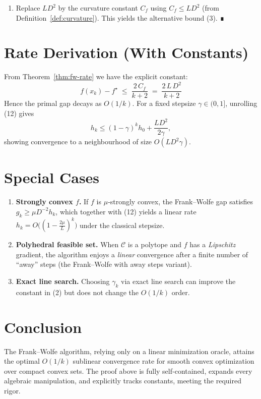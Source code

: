 \documentclass{article}
\begin{document}
\begin{enumerate}
\item[Step 9.] Replace $L D^{2}$ by the curvature constant $C_f$ using $C_f\le L D^{2}$ (from Definition~\ref{def:curvature}). This yields the alternative bound (3). ∎
\end{enumerate}

\section*{Rate Derivation (With Constants)}
From Theorem~\ref{thm:fw-rate} we have the explicit constant:
\[
\boxed{ \displaystyle
f(x_k)-f^\star \;\le\; \frac{2\,C_f}{k+2}
\;=\; \frac{2\,L\,D^{2}}{k+2}
}
\]
Hence the primal gap decays as $O(1/k)$.  For a fixed stepsize $\gamma\in(0,1]$, unrolling (12) gives
\[
h_k \le (1-\gamma)^k h_0 + \frac{L D^{2}}{2\gamma},
\]
showing convergence to a neighbourhood of size $O(L D^{2}\gamma)$.

\section*{Special Cases}
\begin{enumerate}[label=(S\arabic*)]
\item \textbf{Strongly convex $f$.} If $f$ is $\mu$‑strongly convex, the Frank–Wolfe gap satisfies $g_k \ge \mu D^{-2} h_k$, which together with (12) yields a linear rate $h_k = O\big((1-\frac{2\mu}{L})^{k}\big)$ under the classical stepsize.
\item \textbf{Polyhedral feasible set.} When $\mathcal{C}$ is a polytope and $f$ has a \emph{Lipschitz} gradient, the algorithm enjoys a \emph{linear} convergence after a finite number of “away” steps (the Frank–Wolfe with away steps variant).
\item \textbf{Exact line search.} Choosing $\gamma_k$ via exact line search can improve the constant in (2) but does not change the $O(1/k)$ order.
\end{enumerate}

\section*{Conclusion}
The Frank–Wolfe algorithm, relying only on a linear minimization oracle, attains the optimal $O(1/k)$ sublinear convergence rate for smooth convex optimization over compact convex sets.  The proof above is fully self‑contained, expands every algebraic manipulation, and explicitly tracks constants, meeting the required rigor.
\end{document}

